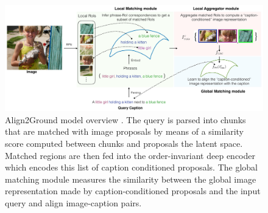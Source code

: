 \begin{figure}
  \centering
  \includegraphics[width=.8\textwidth]{figures/align2ground-model.png}
  \caption[Align2Ground model overview]{Align2Ground model overview
  \cite{datta2019align2ground}. The query is parsed into chunks that
  are matched with image proposals by means of a similarity score
  computed between chunks and proposals the latent space. Matched
  regions are then fed into the order-invariant deep encoder which
  encodes this list of caption conditioned proposals. The global
  matching module measures the similarity between the global image
  representation made by caption-conditioned proposals and the input
  query and align image-caption pairs.}
  \label{fig:align2ground-model}
\end{figure}

